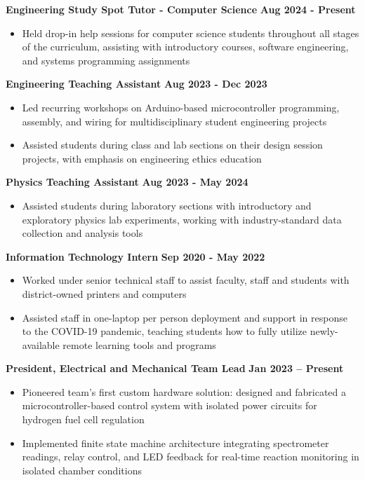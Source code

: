 \documentclass{article}
\begin{document}
\textbf{Engineering Study Spot Tutor - Computer Science} \hfill \textbf{Aug 2024 - Present}
\begin{itemize}[noitemsep,topsep=2pt]
	\item Held drop-in help sessions for computer science students throughout all stages of the curriculum, assisting with introductory courses, software engineering, and systems programming assignments
\end{itemize}

\textbf{Engineering Teaching Assistant} \hfill \textbf{Aug 2023 - Dec 2023}
\begin{itemize}[noitemsep,topsep=2pt]
	\item Led recurring workshops on Arduino-based microcontroller programming, assembly, and wiring for multidisciplinary student engineering projects
	\item Assisted students during class and lab sections on their design session projects, with emphasis on engineering ethics education
\end{itemize}

\textbf{Physics Teaching Assistant} \hfill \textbf{Aug 2023 - May 2024}
\begin{itemize}[noitemsep,topsep=2pt]
	\item Assisted students during laboratory sections with introductory and exploratory physics lab experiments, working with industry-standard data collection and analysis tools
\end{itemize}

 \hfill {}

\textbf{Information Technology Intern} \hfill \textbf{Sep 2020 - May 2022}
\begin{itemize}[noitemsep,topsep=2pt]
	\item Worked under senior technical staff to assist faculty, staff and students with district-owned printers and computers
	\item Assisted staff in one-laptop per person deployment and support in response to the COVID-19 pandemic, teaching students how to fully utilize newly-available remote learning tools and programs
\end{itemize}


 \hfill {}

\textbf{President, Electrical and Mechanical Team Lead} \hfill \textbf{Jan 2023 – Present}
\begin{itemize}[noitemsep,topsep=2pt]
	\item Pioneered team's first custom hardware solution: designed and fabricated a microcontroller-based control system with isolated power circuits for hydrogen fuel cell regulation
    \item Implemented finite state machine architecture integrating spectrometer readings, relay control, and LED feedback for real-time reaction monitoring in isolated chamber conditions
\end{itemize}
\end{document}
